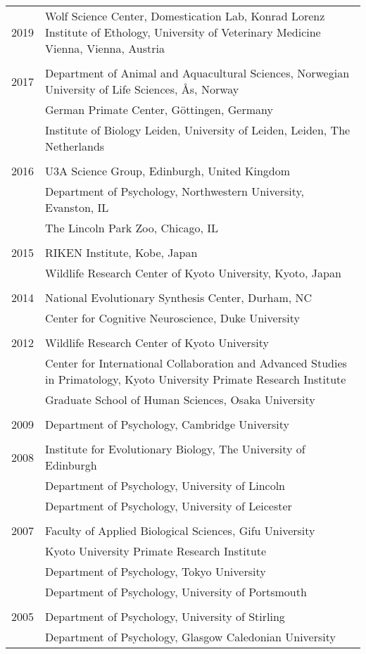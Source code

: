 \documentclass[11pt]{article}
\begin{document}
\begin{tabular}{p{3cm}p{12cm}}
2019 & Wolf Science Center, Domestication Lab, Konrad Lorenz Institute
of Ethology, University of Veterinary Medicine Vienna, Vienna,
Austria\\ \\
2017 & Department of Animal and Aquacultural Sciences, Norwegian University of Life Sciences, {\AA}s, Norway \\
& German Primate Center, G\"{o}ttingen, Germany \\
& Institute of Biology Leiden, University of Leiden, Leiden, The
Netherlands \\ \\
2016 & U3A Science Group, Edinburgh, United Kingdom \\
& Department of Psychology, Northwestern University, Evanston, IL \\
& The Lincoln Park Zoo, Chicago, IL \\ \\
2015 & RIKEN Institute, Kobe, Japan \\ 
& Wildlife Research Center of Kyoto University, Kyoto, Japan \\ \\
2014 & National Evolutionary Synthesis Center, Durham, NC \\
& Center for Cognitive Neuroscience, Duke University \\ \\
2012 & Wildlife Research Center of Kyoto University \\
& Center for International Collaboration and Advanced Studies in
Primatology, Kyoto University Primate Research Institute \\
& Graduate School of Human Sciences, Osaka University \\ \\
2009 & Department of Psychology, Cambridge University \\ \\
2008 & Institute for Evolutionary Biology, The University of Edinburgh
\\
& Department of Psychology, University of Lincoln \\
& Department of Psychology, University of Leicester \\ \\
2007 & Faculty of Applied Biological Sciences, Gifu University \\
& Kyoto University Primate Research Institute \\
& Department of Psychology, Tokyo University \\
& Department of Psychology, University of Portsmouth \\ \\
2005 & Department of Psychology, University of Stirling \\
& Department of Psychology, Glasgow Caledonian University
\end{tabular}
\end{document}
